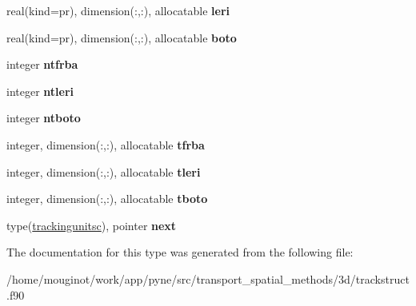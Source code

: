 \begin{DoxyCompactItemize}
\item 
\mbox{\label{structtracking__data__structures_1_1trackingunitsc_aa934ab0e755a0b93684a164d488a9dbc}} 
real(kind=pr), dimension(\+:,\+:), allocatable {\bfseries leri}
\item 
\mbox{\label{structtracking__data__structures_1_1trackingunitsc_a70abfc5a80da58e072279c907d938c58}} 
real(kind=pr), dimension(\+:,\+:), allocatable {\bfseries boto}
\item 
\mbox{\label{structtracking__data__structures_1_1trackingunitsc_aa012520bb3114f12330bab6dc622d65f}} 
integer {\bfseries ntfrba}
\item 
\mbox{\label{structtracking__data__structures_1_1trackingunitsc_afb75bfc5203ec62bc57bb4670cffd038}} 
integer {\bfseries ntleri}
\item 
\mbox{\label{structtracking__data__structures_1_1trackingunitsc_a598a46de00c6e997e911395a61e8b93f}} 
integer {\bfseries ntboto}
\item 
\mbox{\label{structtracking__data__structures_1_1trackingunitsc_ad62a2a789e69c13f7f40322f89303ac2}} 
integer, dimension(\+:,\+:), allocatable {\bfseries tfrba}
\item 
\mbox{\label{structtracking__data__structures_1_1trackingunitsc_af498c2cfd96a18df741805988a6d3ea5}} 
integer, dimension(\+:,\+:), allocatable {\bfseries tleri}
\item 
\mbox{\label{structtracking__data__structures_1_1trackingunitsc_a6b3cceaa9cf6b60ea0330fc48f3ab107}} 
integer, dimension(\+:,\+:), allocatable {\bfseries tboto}
\item 
\mbox{\label{structtracking__data__structures_1_1trackingunitsc_ad91a2408f427440a9f4a543bc5923a92}} 
type(\hyperlink{structtracking__data__structures_1_1trackingunitsc}{trackingunitsc}), pointer {\bfseries next}
\end{DoxyCompactItemize}


The documentation for this type was generated from the following file\+:\begin{DoxyCompactItemize}
\item 
/home/mouginot/work/app/pyne/src/transport\+\_\+spatial\+\_\+methods/3d/trackstruct.\+f90\end{DoxyCompactItemize}
